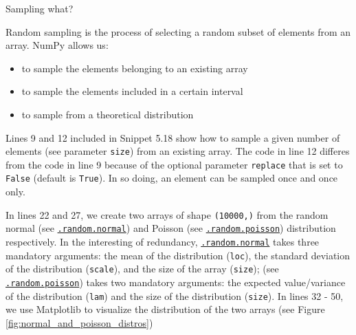 \documentclass[a4paper,11pt]{book}
\numberwithin{figure}{chapter}
\numberwithin{table}{chapter}
\newcommand{\question}[1]{%
    \begin{tcolorbox}[colback=comp_c!10,colframe=comp_c,sidebyside align=top,width=\linewidth,before skip=1ex]
        #1
    \end{tcolorbox}
    \switchcolumn%
}
\newcommand{\note}[1]{%
    \begin{tcolorbox}[colback=white!0,colframe=white!10,width=\linewidth,before skip=1ex]
        #1
    \end{tcolorbox}
}
\begin{document}
\begin{paracol}{2}
	\question{\raggedright Sampling what?}
	\note{Random sampling is the process of selecting a random subset of elements from an array. NumPy allows us:
	\begin{itemize}
		\item to sample the elements belonging to an existing array
		\item to sample the elements included in a certain interval
		\item to sample from a theoretical distribution
	\end{itemize}
	
	\quad Lines 9 and 12 included in Snippet 5.18 show how to sample a given number of elements (see parameter \texttt{size}) from an existing array. The code in line 12 differes from the code in line 9 because of the optional parameter \texttt{replace} that is set to \texttt{False} (default is \texttt{True}). In so doing, an element can be sampled once and once only.
	
	\quad In lines 22 and 27, we create two arrays of shape \texttt{(10000,)} from the random normal (see \href{https://numpy.org/doc/stable/reference/random/generated/numpy.random.Generator.normal.html}{\texttt{.random.normal}}) and Poisson (see \href{https://numpy.org/doc/stable/reference/random/generated/numpy.random.Generator.poisson.html}{\texttt{.random.poisson}}) distribution respectively. In the interesting of redundancy, \href{https://numpy.org/doc/stable/reference/random/generated/numpy.random.Generator.normal.html}{\texttt{.random.normal}} takes three mandatory arguments: the mean of the distribution (\texttt{loc}), the standard deviation of the distribution (\texttt{scale}), and the size of the array (\texttt{size}); (see \href{https://numpy.org/doc/stable/reference/random/generated/numpy.random.Generator.poisson.html}{\texttt{.random.poisson}}) takes two mandatory arguments: the expected value/variance of the distribution (\texttt{lam}) and the size of the distribution (\texttt{size}). In lines 32 - 50, we use Matplotlib to visualize the distribution of the two arrays (see Figure \ref{fig:normal_and_poisson_distros}) 
	}
\end{paracol}
\end{document}
